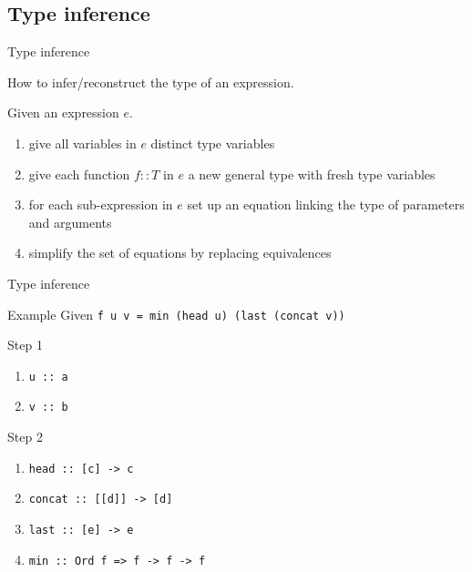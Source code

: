 \documentclass{beamer}
\def\code#1{\texttt{\frenchspacing#1}}
\begin{document}
\subsection{Type inference}

\begin{frame}{Type inference}

\begin{block}{\centering How to infer/reconstruct the type of an expression.}
\end{block}

\pause

Given an expression $e$.\pause
\begin{enumerate}
    \item give all variables in $e$ distinct type variables\pause
    \item give each function $f :: T$ in $e$ a new general type with fresh type variables\pause
    \item for each sub-expression in $e$ set up an equation linking the type of parameters and arguments\pause
    \item simplify the set of equations by replacing equivalences
\end{enumerate}

\end{frame}

\begin{frame}{Type inference}

\begin{exampleblock}{Example}
Given \code{f u v = min (head u) (last (concat v))}

\pause

\vspace{0.25cm}
Step 1\pause
\begin{enumerate}
    \item \code{u :: a}
    \item \code{v :: b}
\end{enumerate}
Step 2\pause
\begin{enumerate}
    \item \code{head :: [c] -> c}\pause
    \item \code{concat :: [[d]] -> [d]}\pause
    \item \code{last :: [e] -> e}\pause
    \item \code{min :: Ord f => f -> f -> f}
\end{enumerate}
\end{exampleblock}

\end{frame}
\end{document}
